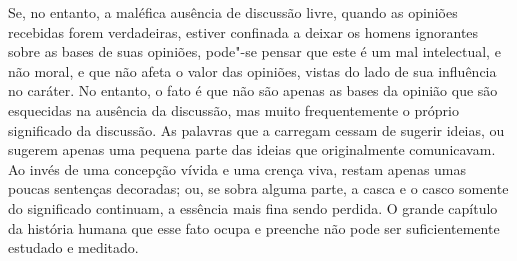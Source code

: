 Se, no entanto, a maléfica ausência de discussão livre,
quando as opiniões recebidas forem verdadeiras, estiver confinada a
deixar os homens ignorantes sobre as bases de suas opiniões, pode"-se
pensar que este é um mal intelectual, e não moral, e que não afeta o
valor das opiniões, vistas do lado de sua influência no caráter. No
entanto, o fato é que não são apenas as bases da opinião que são
esquecidas na ausência da discussão, mas muito frequentemente o próprio
significado da discussão. As palavras que a carregam cessam de sugerir
ideias, ou sugerem apenas uma pequena parte das ideias que
originalmente comunicavam. Ao invés de uma concepção vívida e uma
crença viva, restam apenas umas poucas sentenças decoradas; ou, se
sobra alguma parte, a casca e o casco somente do significado continuam, a
essência mais fina sendo perdida. O grande capítulo da história humana
que esse fato ocupa e preenche não pode ser suficientemente estudado e meditado.

